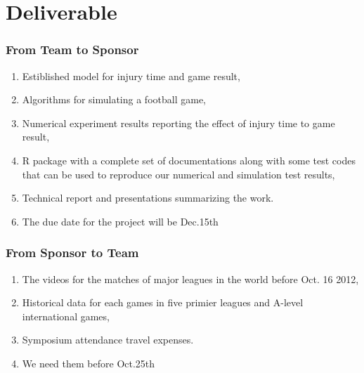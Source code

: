 \documentclass[compress,handout,10pt]{beamer}
\let\olditem\item
\renewcommand{\item}{\setlength{\itemsep}{0.5\baselineskip}\olditem}
\begin{document}
\section{Deliverable}
\begin{frame}
    \frametitle{From Team to Sponsor}
       \begin{enumerate}
         \item Estiblished model for injury time and game result,
         \item Algorithms for simulating a football game,
         \item Numerical experiment results reporting the effect of injury time to game result,
         \item R package with a complete set of documentations along with some test 
        codes that can be used to reproduce our numerical and simulation test results,
         \item Technical report and presentations summarizing the work. 
         \item  The due date for the project will be Dec.15th
       \end{enumerate}
\end{frame}

\begin{frame}
    \frametitle{From Sponsor to Team}
   \begin{enumerate}
         \item The videos for the matches of major leagues in the world before Oct. 16 2012,
         \item Historical data for each games in five primier leagues and A-level international games,
        \item Symposium attendance travel expenses.
         \item  We need them before Oct.25th
       \end{enumerate}
\end{frame}


\begin{frame}


\end{frame}
\end{document}

